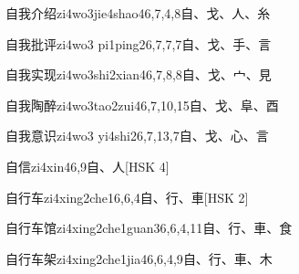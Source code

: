 \begin{EntryWithPhonetic}{自我介绍}{zi4wo3jie4shao4}{6,7,4,8}{⾃、⼽、⼈、⽷}
\end{EntryWithPhonetic}

\begin{EntryWithPhonetic}{自我批评}{zi4wo3 pi1ping2}{6,7,7,7}{⾃、⼽、⼿、⾔}
\end{EntryWithPhonetic}

\begin{EntryWithPhonetic}{自我实现}{zi4wo3shi2xian4}{6,7,8,8}{⾃、⼽、⼧、⾒}
\end{EntryWithPhonetic}

\begin{EntryWithPhonetic}{自我陶醉}{zi4wo3tao2zui4}{6,7,10,15}{⾃、⼽、⾩、⾣}
\end{EntryWithPhonetic}

\begin{EntryWithPhonetic}{自我意识}{zi4wo3 yi4shi2}{6,7,13,7}{⾃、⼽、⼼、⾔}
\end{EntryWithPhonetic}

\begin{EntryWithPhonetic}{自信}{zi4xin4}{6,9}{⾃、⼈}[HSK 4]
\end{EntryWithPhonetic}

\begin{EntryWithPhonetic}{自行车}{zi4xing2che1}{6,6,4}{⾃、⾏、⾞}[HSK 2]
\end{EntryWithPhonetic}

\begin{EntryWithPhonetic}{自行车馆}{zi4xing2che1guan3}{6,6,4,11}{⾃、⾏、⾞、⾷}
\end{EntryWithPhonetic}

\begin{EntryWithPhonetic}{自行车架}{zi4xing2che1jia4}{6,6,4,9}{⾃、⾏、⾞、⽊}
\end{EntryWithPhonetic}

